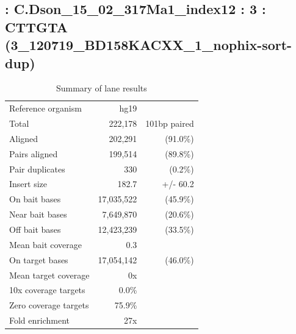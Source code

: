 \documentclass{article}
\begin{document}
    
\subsection*{ : C.Dson\_15\_02\_317Ma1\_index12 : 3 : CTTGTA (3\_120719\_BD158KACXX\_1\_nophix-sort-dup)}

    \begin{table}[h]
    \centering
    \begin{tabular}{|l|rr|}
    \hline
            Reference organism & hg19 &  \\ 
            Total & 222,178 & 101bp paired \\ 
            Aligned & 202,291 & (91.0\%) \\ 
            Pairs aligned & 199,514 & (89.8\%) \\ 
            Pair duplicates & 330 & (0.2\%) \\ 
            Insert size & 182.7 & +/- 60.2 \\ 
            \hline
            On bait bases & 17,035,522 & (45.9\%) \\ 
            Near bait bases & 7,649,870 & (20.6\%) \\ 
            Off bait bases & 12,423,239 & (33.5\%) \\ 
            Mean bait coverage & 0.3 &  \\ 
            On target bases & 17,054,142 & (46.0\%) \\ 
            Mean target coverage & 0x &  \\ 
            10x coverage targets & 0.0\% &  \\ 
            Zero coverage targets & 75.9\% &  \\ 
            Fold enrichment & 27x &  \\ 
    \hline
    \end{tabular}
    \caption{Summary of lane results}
    \end{table}
\end{document}

